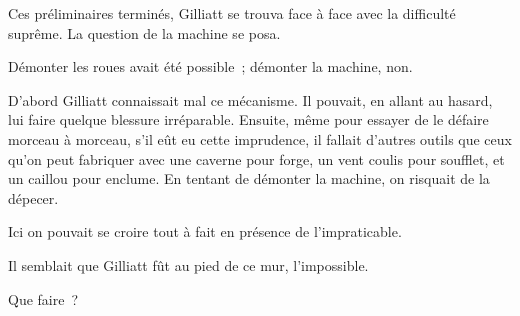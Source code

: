 \documentclass[french,twoside]{book} %
\begin{document}
Ces préliminaires terminés, Gilliatt se trouva face à face avec la difficulté suprême. La question de la machine se posa.\par
Démonter les roues avait été possible ; démonter la machine, non.\par
D’abord Gilliatt connaissait mal ce mécanisme. Il pouvait, en allant au hasard, lui faire quelque blessure irréparable. Ensuite, même pour essayer de le défaire morceau à morceau, s’il eût eu cette imprudence, il fallait d’autres outils que ceux qu’on peut fabriquer avec une caverne pour forge, un vent coulis pour soufflet, et un caillou pour enclume. En tentant de démonter la machine, on risquait de la dépecer.\par
 Ici on pouvait se croire tout à fait en présence de l’impraticable.\par
Il semblait que Gilliatt fût au pied de ce mur, l’impossible.\par
Que faire ?
\end{document}
